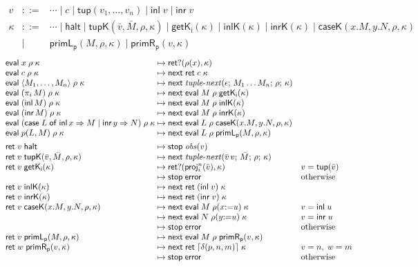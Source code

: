 \documentclass[10pt]{article}
\theoremstyle{acmplain}
\newcommand{\key}[1]{\mathsf{#1}}
\newcommand{\inl}{\key{inl}\,}
\newcommand{\inr}{\key{inr}\,}
\newcommand{\Case}[5]{\key{case}\;#1\;\key{of}\;\key{inl}\,#2 \Rightarrow #3 \mid \key{inr}\,#4 \Rightarrow #5}
\newcommand{\tuple}[1]{\langle #1 \rangle}
\newcommand{\prj}[1]{\pi_{#1}\,}
\newcommand{\prim}[3]{#1(#2, #3)}
\newcommand{\res}[1]{\lceil #1 \rceil}
\newcommand{\ext}[3]{#1(#2{:=}#3)}
\newcommand{\ev}[3]{\key{eval}\;#1\;#2\;#3}
\newcommand{\rt}[2]{\key{ret}\;#1\;#2}
\newcommand{\nxt}{\key{next}\;}
\newcommand{\stp}{\key{stop}\;}
\newcommand{\error}{\key{error}}
\newcommand{\retq}{\key{ret?}}
\newcommand{\obs}{\mathit{obs}}
\newcommand{\tupV}[1]{\key{tup}(#1)}
\newcommand{\inlV}{\key{inl}\;}
\newcommand{\inrV}{\key{inr}\;}
\newcommand{\Kf}[2]{\key{#1}(#2)}
\newcommand{\halt}{\key{halt}}
\newcommand{\tnext}{\mathit{tuple\text{-}next}}
\begin{document}
\[
\begin{array}{rcl}
  v &::=& \cdots \mid c \mid \tupV{v_1, \ldots, v_n} \mid \inlV v \mid \inrV v \\
  \kappa &::=& \cdots \mid \halt \mid \Kf{tupK}{\bar{v}, \bar{M}, \rho, \kappa} \mid \Kf{getK_i}{\kappa}
    \mid \Kf{inlK}{\kappa} \mid \Kf{inrK}{\kappa} \mid \Kf{caseK}{x.M, y.N, \rho, \kappa} \\
  &\mid& \Kf{primL_p}{M, \rho, \kappa} \mid \Kf{primR_p}{v, \kappa}
\end{array}
\]
\[
\begin{array}{@{}l@{\;\mapsto\;}l@{\quad}l@{}}
  \ev{x}{\rho}{\kappa} & \retq(\rho(x), \kappa) \\
  \ev{c}{\rho}{\kappa} & \nxt \rt{c}{\kappa} \\
  \ev{\tuple{M_1, \ldots, M_n}}{\rho}{\kappa} & \nxt \tnext(\epsilon;\, M_1 \ldots M_n;\, \rho;\, \kappa) \\
  \ev{(\prj{i} M)}{\rho}{\kappa} & \nxt \ev{M}{\rho}{\Kf{getK_i}{\kappa}} \\
  \ev{(\inl M)}{\rho}{\kappa} & \nxt \ev{M}{\rho}{\Kf{inlK}{\kappa}} \\
  \ev{(\inr M)}{\rho}{\kappa} & \nxt \ev{M}{\rho}{\Kf{inrK}{\kappa}} \\
  \ev{(\Case{L}{x}{M}{y}{N})}{\rho}{\kappa} & \nxt \ev{L}{\rho}{\Kf{caseK}{x.M, y.N, \rho, \kappa}} \\
  \ev{\prim{p}{L}{M}}{\rho}{\kappa} & \nxt \ev{L}{\rho}{\Kf{primL_p}{M, \rho, \kappa}} \\[1ex]
  \rt{v}{\halt} & \stp \obs(v) \\
  \rt{v}{\Kf{tupK}{\bar{v}, \bar{M}, \rho, \kappa}} & \nxt \tnext(\bar{v}\,v;\, \bar{M};\, \rho;\, \kappa) \\
  \rt{v}{\Kf{getK_i}{\kappa}} & \retq(\key{proj}^n_i(\bar{v}), \kappa) & v = \tupV{\bar{v}} \\
  & \stp \error & \text{otherwise} \\
  \rt{v}{\Kf{inlK}{\kappa}} & \nxt \rt{(\inlV v)}{\kappa} \\
  \rt{v}{\Kf{inrK}{\kappa}} & \nxt \rt{(\inrV v)}{\kappa} \\
  \rt{v}{\Kf{caseK}{x.M, y.N, \rho, \kappa}} & \nxt \ev{M}{\ext{\rho}{x}{u}}{\kappa} & v = \inlV u \\
  & \nxt \ev{N}{\ext{\rho}{y}{u}}{\kappa} & v = \inrV u \\
  & \stp \error & \text{otherwise} \\
  \rt{v}{\Kf{primL_p}{M, \rho, \kappa}} & \nxt \ev{M}{\rho}{\Kf{primR_p}{v, \kappa}} \\
  \rt{w}{\Kf{primR_p}{v, \kappa}} & \nxt \rt{\res{\delta(p, n, m)}}{\kappa} & v = n,\; w = m \\
  & \stp \error & \text{otherwise}
\end{array}
\]
\end{document}
